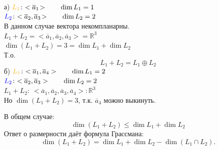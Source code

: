 \noindent а) ${\color{orange}L_1}\!:~ <\overline{a}_1\!> \qquad \dim L_1 = 1$\\
\phantom{а)}${\color{blue}L_2}\!:~ <\overline{a}_2, \overline{a}_3\!> \qquad \dim L_2 = 2$\\
В данном случае вектора некомпланарны.\\
$L_1+L_2=<\overline{a}_1, \overline{a}_2, \overline{a}_3\!> = \mathbb{R}^3$\\
$\dim (L_1 +L_2) = 3 = \dim L_1 + \dim L_2$\\
Т.о.
$$
L_1+L_2 = L_1 \oplus L_2
$$
б) ${\color{orange}L_1}\!:~ <\overline{a}_1, \overline{a}_4> \qquad \dim L_1 = 2$\\
${\color{blue}L_2}\!:~ <\overline{a}_2, \overline{a}_3> \qquad \dim L_2 = 2$\\
$L_1+L_2\!:~<\overline{a}_1, \overline{a}_2, \overline{a}_3, \overline{a}_4\!>: \mathbb{R}^3$\\
Но $\dim (L_1+L_2)=3$, т.к. $\overline{a}_4$ можно выкинуть.

В общем случае:
$$
\dim (L_1+L_2) \leq \dim L_1 + \dim L_2
$$
Ответ о размерности даёт \textsf{формула Грассмана}:
$$
\dim (L_1+L_2)=\dim L_1+ \dim L_2 - \dim(L_1\cap L_2).
$$
